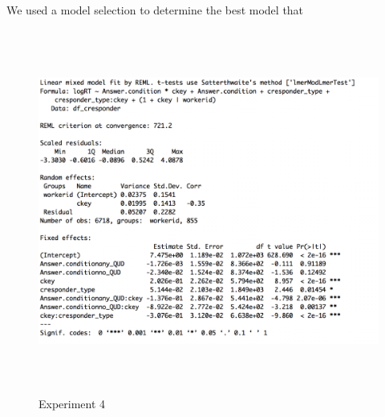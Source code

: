 \documentclass[12pt]{article}
\begin{document}
We used a model selection to determine the best model that 

\begin{figure}[!ht] 
    \centering
    \caption*{Experiment 4}
    \includegraphics[height=12cm]{models/best_model}
\end{figure}

\pagebreak


\end{document}
